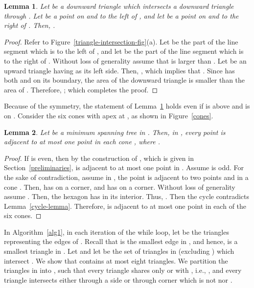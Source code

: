 \documentclass[11pt,a4paper]{article}
\newtheorem{lemma}{Lemma}
\begin{document}
\begin{lemma}
 \label{triangle-intersection-lemma}
Let  be a downward triangle which intersects a downward triangle  through . Let  be a point on  and to the left of , and let  be a point on  and to the right of . Then, .
\end{lemma}
\begin{proof}
 Refer to Figure~\ref{triangle-intersection-fig}(a). Let  be the part of the line segment  which is to the left of , and let  be the part of the line segment  which is to the right of . Without loss of generality assume that  is larger than . Let  be an upward triangle having  as its left side. Then, , which implies that . Since  has both  and  on its boundary, the area of the downward triangle  is smaller than the area of . Therefore, ; which completes the proof.
\end{proof}

Because of the symmetry, the statement of Lemma~\ref{triangle-intersection-lemma} holds even if  is above  and  is on .
Consider the six cones with apex at , as shown in Figure~\ref{cones}.
\begin{lemma}
\label{deg-six-half}
Let  be a minimum spanning tree in . Then, in , every point  is adjacent to at most one point in each cone , where .
\end{lemma}
\begin{proof}
If  is even, then by the construction of , which is given in Section~\ref{preliminaries},  is adjacent to at most one point in . Assume  is odd. For the sake of contradiction, assume in , the point  is adjacent to two points  and  in a cone . Then,  has  on a corner, and  has  on a corner. Without loss of generality assume . Then, the hexagon  has  in its interior. Thus, . Then the cycle  contradicts Lemma~\ref{cycle-lemma}. Therefore,  is adjacent to at most one point in each of the six cones.
\end{proof}


In Algorithm~\ref{alg1}, in each iteration of the {\sf while} loop, let  be the triangles representing the edges of . Recall that  is the smallest edge in , and hence,  is a smallest triangle in .
Let  and let  be the set of triangles in  (excluding ) which intersect . We show that  contains at most eight triangles.
We partition the triangles in  into , such that every triangle  shares only  or  with , i.e., , and every triangle  intersects  either through a side or through corner which is not  nor .
\end{document}
